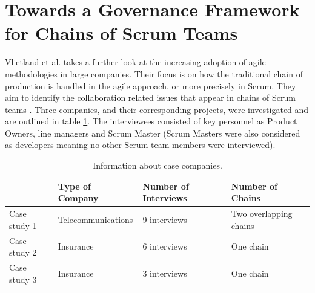 
\section{Towards a Governance Framework for Chains of Scrum Teams}

Vlietland et al. takes a further look at the increasing adoption of agile methodologies in large companies. Their focus is on how the traditional chain of production is handled in the agile approach, or more precisely in Scrum. They aim to identify the collaboration related issues that appear in chains of Scrum teams \cite{Vlietland2015}. Three companies, and their corresponding projects, were investigated and are outlined in table \ref{iacc}. The interviewees consisted of key personnel as Product Owners, line managers and Scrum Master (Scrum Masters were also considered as developers meaning no other Scrum team members were interviewed).

\begin{table}[H]
\begin{center}
    \begin{tabular}{| p{2.25cm} | p{3.75cm} | p{4.5cm} | p{3.75cm} |}
    \hline
     & \textbf{Type of Company} & \textbf{Number of Interviews} & \textbf{Number of Chains} \\ \hline
    Case study 1 & Telecommunications & 9 interviews & Two overlapping chains \\ \hline
    Case study 2 & Insurance & 6 interviews & One chain  \\ \hline
    Case study 3 & Insurance & 3 interviews & One chain \\ \hline
    \end{tabular}
    \caption{Information about case companies.}
    \label{iacc}
\end{center}
\end{table}

